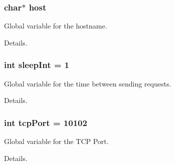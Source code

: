 \subsubsection[{\texorpdfstring{host}{host}}]{\setlength{\rightskip}{0pt plus 5cm}char$\ast$ host}\hypertarget{simple-iec61850-client_8c_a1c2046dcb30a629d6d9f45ff8f403f12}{}\label{simple-iec61850-client_8c_a1c2046dcb30a629d6d9f45ff8f403f12}


Global variable for the hostname. 

Details. 
\subsubsection[{\texorpdfstring{sleep\+Int}{sleepInt}}]{\setlength{\rightskip}{0pt plus 5cm}int sleep\+Int = 1}\hypertarget{simple-iec61850-client_8c_a7c0b25939579bd308b11966fb04288e0}{}\label{simple-iec61850-client_8c_a7c0b25939579bd308b11966fb04288e0}


Global variable for the time between sending requests. 

Details. 
\subsubsection[{\texorpdfstring{tcp\+Port}{tcpPort}}]{\setlength{\rightskip}{0pt plus 5cm}int tcp\+Port = 10102}\hypertarget{simple-iec61850-client_8c_ac31354d08316076b496efb2b3a2c69e6}{}\label{simple-iec61850-client_8c_ac31354d08316076b496efb2b3a2c69e6}


Global variable for the T\+CP Port. 

Details. 